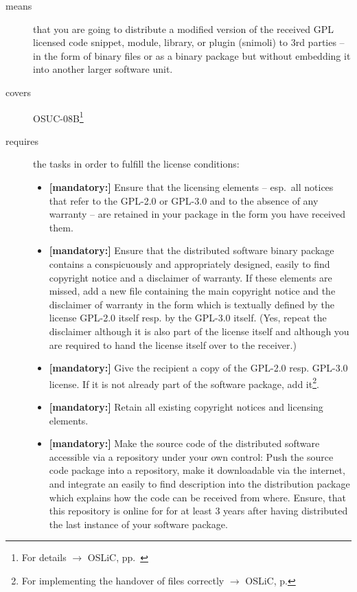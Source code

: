 \begin{description}
\item[means] that you are going to distribute a modified version of the received
GPL licensed code snippet, module, library, or plugin (snimoli) to 3rd parties
-- in the form of binary files or as a binary package but without embedding it
into another larger software unit.
\item[covers] OSUC-08B\footnote{For details $\rightarrow$ OSLiC, pp.\
\pageref{OSUC-08B-DEF}}
\item[requires] the tasks in order to fulfill the license conditions:
\begin{itemize}

  \item \textbf{[mandatory:]} Ensure that the licensing elements -- esp.\ all
  notices that refer to the GPL-2.0 or GPL-3.0 and to the absence of any
  warranty -- are retained in your package in the form you have received them.

  \item \textbf{[mandatory:]} Ensure that the distributed software binary
  package contains a conspicuously and appropriately designed, easily to find
  copyright notice and a disclaimer of warranty. If these elements are missed,
  add a new file containing the main copyright notice and the disclaimer of
  warranty in the form which is textually defined by the license GPL-2.0 itself
  resp. by the GPL-3.0 itself. (Yes, repeat the disclaimer although it is also
  part of the license itself and although you are required to hand the license
  itself over to the receiver.)
  
  \item \textbf{[mandatory:]} Give the recipient a copy of the GPL-2.0 resp.
  GPL-3.0 license. If it is not already part of the software package, add
  it\footnote{For implementing the handover of files correctly $\rightarrow$
  OSLiC, p. \pageref{DistributingFilesHint}}.
  
  \item \textbf{[mandatory:]} Retain all existing copyright notices and
  licensing elements.

  \item \textbf{[mandatory:]} Make the source code of the distributed software
  accessible via a repository under your own control: Push the source code
  package into a repository, make it downloadable via the internet, and
  integrate an easily to find description into the distribution package which
  explains how the code can be received from where. Ensure, that this repository
  is online for for at least 3 years after having distributed the last instance
  of your software package.
  

\end{itemize}
\end{description}
